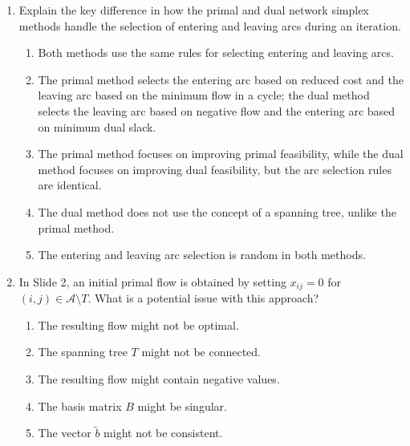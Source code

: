 \documentclass{article}%
\begin{document}
\begin{enumerate}
\begin{enumerate}%
\item This condition guarantees primal feasibility.%
\item This condition guarantees optimality.%
\item This condition guarantees dual feasibility.%
\item This condition is only relevant for the primal simplex method.%
\item This condition is irrelevant to the feasibility or optimality of the solution.%
\end{enumerate}%
\vspace{1em}%
\item Explain the key difference in how the primal and dual network simplex methods handle the selection of entering and leaving arcs during an iteration.%
\begin{enumerate}%
\item Both methods use the same rules for selecting entering and leaving arcs.%
\item The primal method selects the entering arc based on reduced cost and the leaving arc based on the minimum flow in a cycle; the dual method selects the leaving arc based on negative flow and the entering arc based on minimum dual slack.%
\item The primal method focuses on improving primal feasibility, while the dual method focuses on improving dual feasibility, but the arc selection rules are identical.%
\item The dual method does not use the concept of a spanning tree, unlike the primal method.%
\item The entering and leaving arc selection is random in both methods.%
\end{enumerate}%
\vspace{1em}%
\item In Slide 2, an initial primal flow is obtained by setting $x_{ij} = 0$ for $(i, j) \in \mathcal{A} \setminus T$. What is a potential issue with this approach?%
\begin{enumerate}%
\item The resulting flow might not be optimal.%
\item The spanning tree $T$ might not be connected.%
\item The resulting flow might contain negative values.%
\item The basis matrix $B$ might be singular.%
\item The vector $\tilde{b}$ might not be consistent.%

\end{enumerate}
\end{enumerate}
\end{document}
